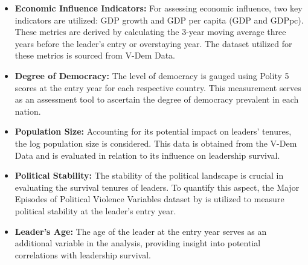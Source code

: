 \documentclass[
  12pt,
  a4paper,
  12pt]{article}
\begin{document}
\begin{itemize}
\item
  \textbf{Economic Influence Indicators:} For assessing economic
  influence, two key indicators are utilized: GDP growth and GDP per
  capita (GDP and GDPpc). These metrics are derived by calculating the
  3-year moving average three years before the leader's entry or
  overstaying year. The dataset utilized for these metrics is sourced
  from V-Dem Data.
\item
  \textbf{Degree of Democracy:} The level of democracy is gauged using
  Polity 5 scores at the entry year for each respective country. This
  measurement serves as an assessment tool to ascertain the degree of
  democracy prevalent in each nation.
\item
  \textbf{Population Size:} Accounting for its potential impact on
  leaders' tenures, the log population size is considered. This data is
  obtained from the V-Dem Data and is evaluated in relation to its
  influence on leadership survival.
\item
  \textbf{Political Stability:} The stability of the political landscape
  is crucial in evaluating the survival tenures of leaders. To quantify
  this aspect, the Major Episodes of Political Violence Variables
  dataset by \citep{goldstone2009} is utilized to measure political
  stability at the leader's entry year.
\item
  \textbf{Leader's Age:} The age of the leader at the entry year serves
  as an additional variable in the analysis, providing insight into
  potential correlations with leadership survival.
\end{itemize}

\newpage


\renewcommand\refname{References}
  
\end{document}
